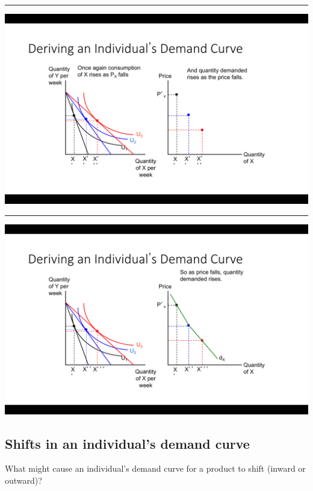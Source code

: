 \documentclass[]{article}
\begin{document}
\begin{center}\rule{0.5\linewidth}{\linethickness}\end{center}

\includegraphics{picsfigs/dmd3.png}\\

\begin{center}\rule{0.5\linewidth}{\linethickness}\end{center}

\includegraphics{picsfigs/dmd4.png}\\

\hypertarget{shifts-in-an-individuals-demand-curve}{%
\subsection{Shifts in an individual's demand
curve}\label{shifts-in-an-individuals-demand-curve}}

What might cause an individual's demand curve for a product to shift
(inward or outward)?
\end{document}
